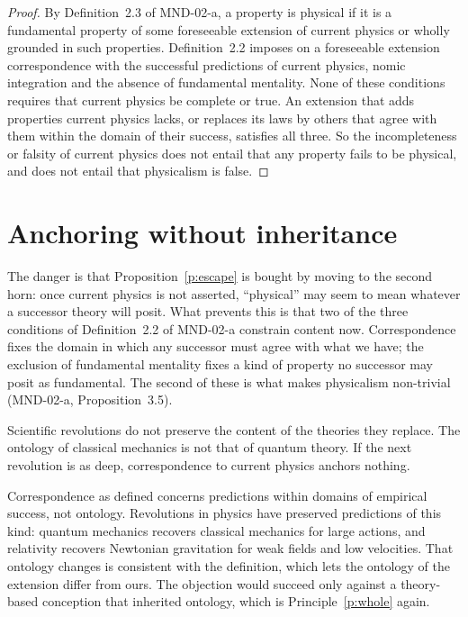 \documentclass{situationist-preprint}
\begin{document}
\begin{proof}
By Definition~2.3 of MND-02-a, a property is physical if it is a fundamental property of some foreseeable extension of current physics or wholly grounded in such properties. Definition~2.2 imposes on a foreseeable extension correspondence with the successful predictions of current physics, nomic integration and the absence of fundamental mentality. None of these conditions requires that current physics be complete or true. An extension that adds properties current physics lacks, or replaces its laws by others that agree with them within the domain of their success, satisfies all three. So the incompleteness or falsity of current physics does not entail that any property fails to be physical, and does not entail that physicalism is false.
\end{proof}

\section{Anchoring without inheritance}

The danger is that Proposition~\ref{p:escape} is bought by moving to the second horn: once current physics is not asserted, \enquote{physical} may seem to mean whatever a successor theory will posit. What prevents this is that two of the three conditions of Definition~2.2 of MND-02-a constrain content now. Correspondence fixes the domain in which any successor must agree with what we have; the exclusion of fundamental mentality fixes a kind of property no successor may posit as fundamental. The second of these is what makes physicalism non-trivial (MND-02-a, Proposition~3.5).

\begin{objection}
Scientific revolutions do not preserve the content of the theories they replace. The ontology of classical mechanics is not that of quantum theory. If the next revolution is as deep, correspondence to current physics anchors nothing.
\end{objection}

\begin{reply}
Correspondence as defined concerns predictions within domains of empirical success, not ontology. Revolutions in physics have preserved predictions of this kind: quantum mechanics recovers classical mechanics for large actions, and relativity recovers Newtonian gravitation for weak fields and low velocities. That ontology changes is consistent with the definition, which lets the ontology of the extension differ from ours. The objection would succeed only against a theory-based conception that inherited ontology, which is Principle~\ref{p:whole} again.
\end{reply}
\end{document}
